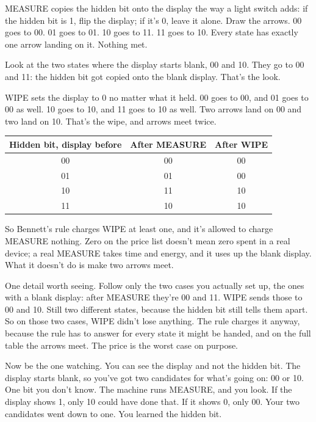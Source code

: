 \documentclass[11pt,twoside]{article}
\theoremstyle{thielethm}
\theoremstyle{thieledef}
\theoremstyle{thieledef}
\theoremstyle{thieledef}
\theoremstyle{thielethm}
\theoremstyle{thieleobs}
\theoremstyle{thielethm}
\begin{document}
MEASURE copies the hidden bit onto the display the way a light switch adds: if the hidden bit is 1, flip the display; if it's 0, leave it alone. Draw the arrows. 00 goes to 00. 01 goes to 01. 10 goes to 11. 11 goes to 10. Every state has exactly one arrow landing on it. Nothing met.

Look at the two states where the display starts blank, 00 and 10. They go to 00 and 11: the hidden bit got copied onto the blank display. That's the look.

WIPE sets the display to 0 no matter what it held. 00 goes to 00, and 01 goes to 00 as well. 10 goes to 10, and 11 goes to 10 as well. Two arrows land on 00 and two land on 10. That's the wipe, and arrows meet twice.

\begin{center}
\small
\begin{tabular}{@{}ccc@{}}
Hidden bit, display before & After MEASURE & After WIPE \\ \hline
00 & 00 & 00 \\
01 & 01 & 00 \\
10 & 11 & 10 \\
11 & 10 & 10 \\ \hline
\end{tabular}
\end{center}

So Bennett's rule charges WIPE at least one, and it's allowed to charge MEASURE nothing. Zero on the price list doesn't mean zero spent in a real device; a real MEASURE takes time and energy, and it uses up the blank display. What it doesn't do is make two arrows meet.

One detail worth seeing. Follow only the two cases you actually set up, the ones with a blank display: after MEASURE they're 00 and 11. WIPE sends those to 00 and 10. Still two different states, because the hidden bit still tells them apart. So on those two cases, WIPE didn't lose anything. The rule charges it anyway, because the rule has to answer for every state it might be handed, and on the full table the arrows meet. The price is the worst case on purpose.

Now be the one watching. You can see the display and not the hidden bit. The display starts blank, so you've got two candidates for what's going on: 00 or 10. One bit you don't know. The machine runs MEASURE, and you look. If the display shows 1, only 10 could have done that. If it shows 0, only 00. Your two candidates went down to one. You learned the hidden bit.
\end{document}
